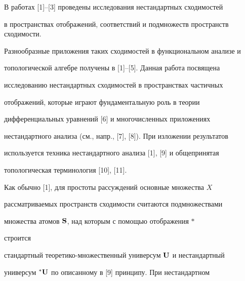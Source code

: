 \date{}







\pagestyle{plain} %













\maketitle


\label{begin}


В работах [1]--[3] проведены исследования нестандартных сходимостей


в пространствах отображений, соответствий и подмножеств пространств сходимости.


Разнообразные приложения таких сходимостей в функциональном анализе и


топологической алгебре получены в [1]--[5]. Данная работа посвящена


исследованию нестандартных сходимостей в пространствах частичных


отображений, которые играют фундаментальную роль в теории


дифференциальных уравнений [6] и многочисленных приложениях


нестандартного анализа (см., напр., [7], [8]). При изложении результатов


используется техника нестандартного анализа [1], [9] и общепринятая


топологическая терминология [10], [11].





Как обычно [1], для простоты рассуждений основные множества $X$


рассматриваемых пространств сходимости считаются подмножествами


множества атомов $\bold S$, над которым с помощью отображения $*$


строится


стандартный теоретико-множественный универсум $\bold U$ и нестандартный


универсум ${}^*\bold U$ по описанному в [9] принципу. При нестандартном


